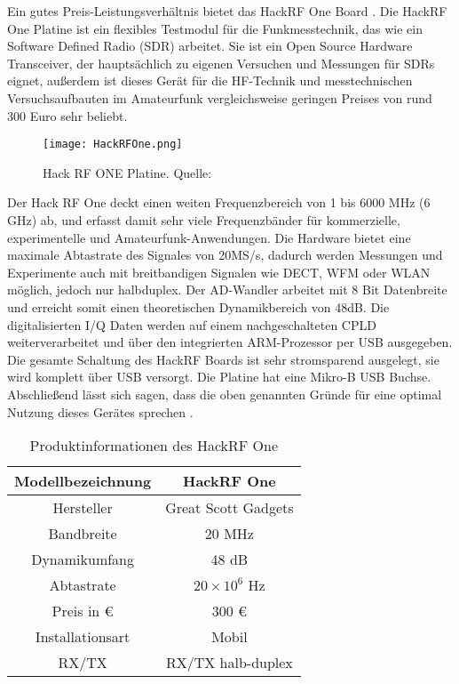 Ein gutes Preis-Leistungsverhältnis bietet das HackRF One Board \cite{greatscott}. Die HackRF One Platine ist ein flexibles Testmodul für die Funkmesstechnik, das wie ein Software Defined Radio (SDR) arbeitet. Sie ist ein Open Source Hardware Transceiver, der hauptsächlich zu eigenen Versuchen und Messungen für SDRs eignet, außerdem ist dieses Gerät für die HF-Technik und messtechnischen Versuchsaufbauten im Amateurfunk vergleichsweise geringen Preises von rund 300 Euro sehr beliebt.\\

\begin{figure}[H]
	\centering
	\texttt{[image: HackRFOne.png]}
	\caption[Hack RF ONE Platine]{Hack RF ONE Platine. Quelle: \cite{wimo:2018}} 
	\label{HackRFOne}
\end{figure}

Der Hack RF One deckt einen weiten Frequenzbereich von 1 bis 6000 MHz (6 GHz) ab, und erfasst damit sehr viele Frequenzbänder für kommerzielle, experimentelle und Amateurfunk-Anwendungen. Die Hardware bietet eine maximale Abtastrate des Signales von 20MS/s, dadurch werden Messungen und Experimente auch mit breitbandigen Signalen wie DECT, WFM oder WLAN möglich, jedoch nur halbduplex. Der AD-Wandler arbeitet mit 8 Bit Datenbreite und erreicht somit einen theoretischen Dynamikbereich von 48dB. Die digitalisierten I/Q Daten werden auf einem nachgeschalteten CPLD weiterverarbeitet und über den integrierten ARM-Prozessor per USB ausgegeben. Die gesamte Schaltung des HackRF Boards ist sehr stromsparend ausgelegt, sie wird komplett über USB versorgt. Die Platine hat eine Mikro-B USB Buchse. Abschließend lässt sich sagen, dass die oben genannten Gründe für eine optimal Nutzung dieses Gerätes sprechen \cite{wimo:2018}.\\

\begin{table}[ht]
	\centering
	\begin{tabular}{c|c}
		Modellbezeichnung & HackRF One  \\
		\hline
		Hersteller & Great Scott Gadgets\\ 
		\hline 
		Bandbreite & 20 MHz \\ 
		\hline 
		Dynamikumfang & 48 dB \\ %
		\hline 
		Abtastrate & \( 20 \times 10^{6} \) Hz \\ 
		\hline 
		Preis in \euro &  300 \euro\\ 
		\hline 
		Installationsart & Mobil \\ 
		\hline 
		RX/TX & RX/TX halb-duplex \\ 
	\end{tabular} 
	\caption{Produktinformationen des HackRF One}
\end{table}

